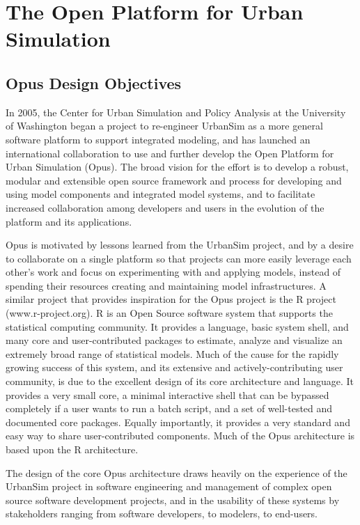 \chapter{The Open Platform for Urban Simulation}

\section{Opus Design Objectives}
In 2005, the Center for Urban Simulation and Policy Analysis at the University of Washington 
began a project to re-engineer UrbanSim as a more general software platform to support
integrated modeling, and has launched an international collaboration to use and further 
develop the Open Platform for Urban Simulation (Opus).  The broad vision for the effort is 
to develop a robust, modular and extensible open source framework and process for 
developing and using model components and integrated model systems, and to facilitate 
increased collaboration among developers and users in the evolution of the platform and 
its applications.  

Opus is motivated by lessons learned from the UrbanSim project, and by a desire to collaborate 
on a single platform so that projects can more easily leverage each other's work and focus on 
experimenting with and applying models, instead of spending their resources creating and 
maintaining model infrastructures.  
A similar project that provides inspiration for the Opus project is the R project (www.r-project.org).  
R \cite{ihaka-gentleman-1996} is an Open Source software system that supports the statistical 
computing community.  It provides a language, basic system shell, and many core and 
user-contributed packages to estimate, analyze and visualize an extremely broad range of statistical 
models.  Much of the cause for the rapidly growing success of this system, and its extensive and 
actively-contributing user community, is due to the excellent design of its core architecture and 
language.  It provides a very small core, a minimal interactive shell that can be bypassed completely 
if a user wants to run a batch script, and a set of well-tested and documented core packages.  Equally 
importantly, it provides a very standard and easy way to share user-contributed components.  Much 
of the Opus architecture is based upon the R architecture.

The design of the core Opus architecture draws heavily on the experience of the UrbanSim project in 
software engineering and management of complex open source software development projects, and 
in the usability of these systems by stakeholders ranging from software developers, to modelers, to 
end-users.   

